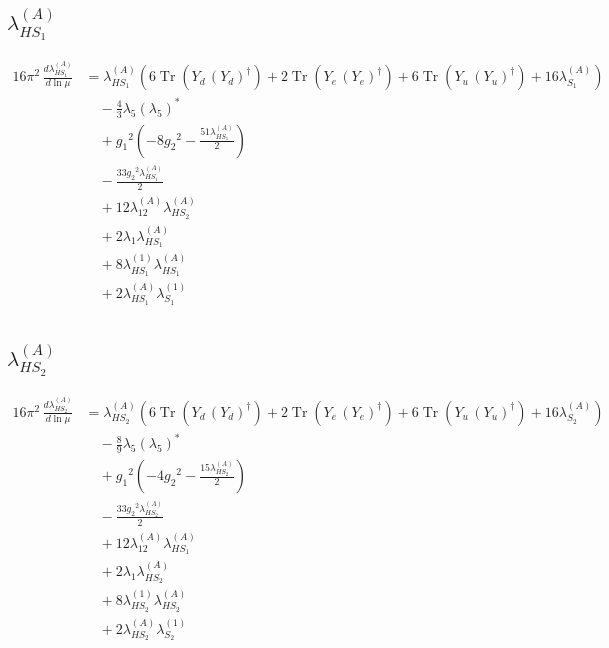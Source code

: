 \documentclass[10pt,a4paper]{article}
\begin{document}
\subsection*{$\lambda_{HS_1}^{(A)}$}
\begin{align*}
16\pi^2\,\frac{d \lambda_{HS_1}^{(A)}}{d\ln\mu} &={\lambda_{HS_1}^{(A)}} (6 \operatorname{Tr}\!\left({Y_d}\,\left({Y_d}\right)^{\dagger}\right)+2 \operatorname{Tr}\!\left({Y_e}\,\left({Y_e}\right)^{\dagger}\right)+6 \operatorname{Tr}\!\left({Y_u}\,\left({Y_u}\right)^{\dagger}\right)+16 {\lambda_{S_1}^{(A)}}) \\
&\quad -\frac{4}{3} {\lambda_5} \left({\lambda_5}\right)^{*} \\
&\quad +{g_1}^2 \left(-8 {g_2}^2-\frac{51 {\lambda_{HS_1}^{(A)}}}{2}\right) \\
&\quad -\frac{33 {g_2}^2 {\lambda_{HS_1}^{(A)}}}{2} \\
&\quad +12 {\lambda_{12}^{(A)}} {\lambda_{HS_2}^{(A)}} \\
&\quad +2 {\lambda_1} {\lambda_{HS_1}^{(A)}} \\
&\quad +8 {\lambda_{HS_1}^{(1)}} {\lambda_{HS_1}^{(A)}} \\
&\quad +2 {\lambda_{HS_1}^{(A)}} {\lambda_{S_1}^{(1)}} \\
\end{align*}
\subsection*{$\lambda_{HS_2}^{(A)}$}
\begin{align*}
16\pi^2\,\frac{d \lambda_{HS_2}^{(A)}}{d\ln\mu} &={\lambda_{HS_2}^{(A)}} (6 \operatorname{Tr}\!\left({Y_d}\,\left({Y_d}\right)^{\dagger}\right)+2 \operatorname{Tr}\!\left({Y_e}\,\left({Y_e}\right)^{\dagger}\right)+6 \operatorname{Tr}\!\left({Y_u}\,\left({Y_u}\right)^{\dagger}\right)+16 {\lambda_{S_2}^{(A)}}) \\
&\quad -\frac{8}{9} {\lambda_5} \left({\lambda_5}\right)^{*} \\
&\quad +{g_1}^2 \left(-4 {g_2}^2-\frac{15 {\lambda_{HS_2}^{(A)}}}{2}\right) \\
&\quad -\frac{33 {g_2}^2 {\lambda_{HS_2}^{(A)}}}{2} \\
&\quad +12 {\lambda_{12}^{(A)}} {\lambda_{HS_1}^{(A)}} \\
&\quad +2 {\lambda_1} {\lambda_{HS_2}^{(A)}} \\
&\quad +8 {\lambda_{HS_2}^{(1)}} {\lambda_{HS_2}^{(A)}} \\
&\quad +2 {\lambda_{HS_2}^{(A)}} {\lambda_{S_2}^{(1)}} \\
\end{align*}
\end{document}
